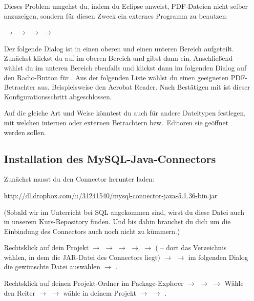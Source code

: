 Dieses Problem umgehst du, indem du Eclipse anweist, PDF-Dateien nicht selber
anzuzeigen, sondern für diesen Zweck ein externes Programm zu benutzen:

 $\rightarrow$  $\rightarrow$ 
$\rightarrow$  $\rightarrow$ 

Der folgende Dialog ist in einen oberen und einen unteren Bereich aufgeteilt.
Zunächst klickst du auf  im oberen Bereich und gibst dann
 ein. Anschließend wählst du im unteren Bereich ebenfalls
 und klickst dann im folgenden Dialog auf den Radio-Button für
. Aus der folgenden Liste wählst du einen geeigneten
PDF-Betrachter aus. Beispielsweise den Acrobat Reader. Nach Bestätigen mit
 ist dieser Konfigurationsschritt abgeschlossen.

Auf die gleiche Art und Weise könntest du auch für andere Dateitypen festlegen,
mit welchen internen oder externen Betrachtern bzw.\ Editoren sie geöffnet
werden sollen.


\subsection{Installation des
MySQL-Java-Connectors}\label{mysql-connector-installation}

Zunächst musst du den Connector herunter laden:

\url{http://dl.dropbox.com/u/31241540/mysql-connector-java-5.1.36-bin.jar}

(Sobald wir im Unterricht bei SQL angekommen sind, wirst du diese Datei auch in
unserem Kurs-Repository finden. Und bis dahin brauchst du dich um die
Einbindung des Connectors auch noch nicht zu kümmern.)

Rechtsklick auf dein Projekt $\rightarrow$  $\rightarrow$
 $\rightarrow$  $\rightarrow$ 
$\rightarrow$  ( -- dort das Verzeichnis
wählen, in dem die JAR-Datei des Connectors liegt) $\rightarrow$ 
$\rightarrow$ im folgenden Dialog die gewünschte Datei auswählen $\rightarrow$
.

Rechtsklick auf deinen Projekt-Ordner im Package-Explorer $\rightarrow$
 $\rightarrow$ 
$\rightarrow$ Wähle den Reiter  $\rightarrow$  $\rightarrow$ wähle  in
deinem Projekt $\rightarrow$  $\rightarrow$ .

